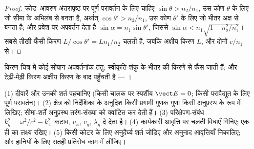 \begin{proof}
क्रोड--आवरण अंतरापृष्ठ पर पूर्ण परावर्तन के लिए चाहिए $\sin\theta >
n_2/n_1$, उस कोण $\theta$ के लिए जो सीमा के अभिलंब से बनता है, अर्थात् $\cos
\theta' > n_2/n_1$, उस कोण $\theta'$ के लिए जो भीतर अक्ष से बनता है; और प्रवेश पर अपवर्तन
देता है $\sin\alpha = n_1\sin\theta'$, जिससे $\sin\alpha < n_1\sqrt{1
- n_2^2/n_1^2}$। सबसे तीखी फँसी किरण $L/\cos\theta' = Ln_1/n_2$ चलती है,
जबकि अक्षीय किरण $L$, और दोनों $c/n_1$ से।
\end{proof}

\begin{omfigure}

{\small किरण चित्र में कोई सोपान-अपवर्तनांक तंतु: स्वीकृति-शंकु के भीतर
की किरणें  से फँस जाती हैं; और टेढ़ी-मेढ़ी किरण
अक्षीय किरण के बाद पहुँचती है --- ।}
\end{omfigure}

\begin{method}[निर्देशित-तरंग का हिसाब]\label{met:b2:guided-waves:method}
(1) दीवारें और उनकी शर्त पहचानिए (किसी चालक पर स्पर्शीय $\vect E = 0$;
किसी परावैद्युत के लिए पूर्ण परावर्तन)। (2) क्षेत्र को
निर्देशिका के अनुदिश किसी प्रगामी गुणक गुणा किसी अनुप्रस्थ 
के रूप में लिखिए; सीमा-शर्तें अनुप्रस्थ तरंग-संख्या को क्वांटित कर देती हैं।
(3) परिक्षेपण-संबंध $k_g^2 = \omega^2/c^2 - k_\perp^2$ कटाव, $v_\varphi$, $v_g$,
$\lambda_g$ दे देता है। (4) कार्यकारी आवृत्ति पर चलती विधाएँ गिनिए; एक ही
का लक्ष्य रखिए। (5) किसी कोटर के लिए अनुदैर्घ्य शर्त जोड़िए और अनुनाद
आवृत्तियाँ निकालिए; और हानियों के लिए सतही प्रतिरोध काम में लीजिए।
\end{method}


